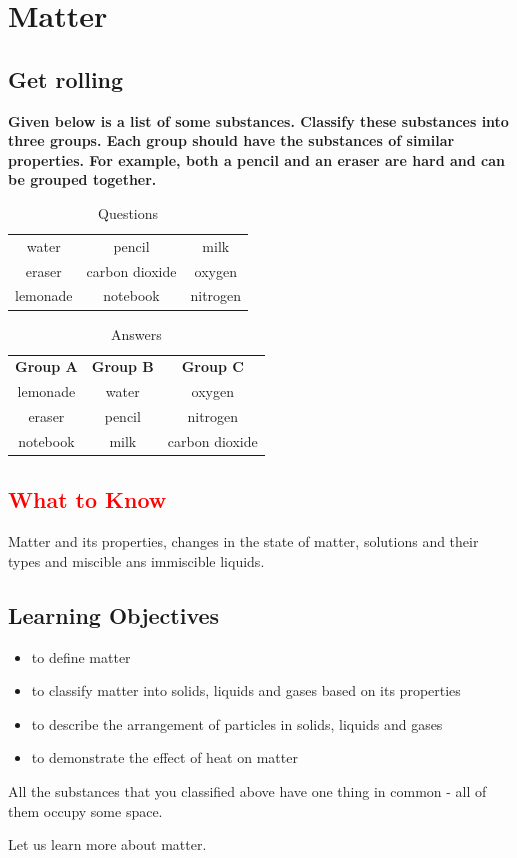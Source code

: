 \chapter{Matter}
\section{\textbf{Get rolling}}
\textbf{Given below is a list of some substances. Classify these substances into three groups. Each group should have the substances of similar properties. For example, both a pencil and an eraser are hard and can be grouped together.}\\
\begin{table}
    \centering
    \begin{tabular}{ccc}
water & pencil & milk\\
eraser & carbon dioxide & oxygen\\
lemonade & notebook & nitrogen
    \end{tabular}
    \caption{Questions}
    \label{tab:placeholder}
\end{table}
\begin{table}
    \centering
    \begin{tabular}{ccc}
\textbf{Group A} & \textbf{Group B} & \textbf{Group C}\\
lemonade & water & oxygen\\
eraser & pencil & nitrogen\\
notebook & milk & carbon dioxide
    \end{tabular}
    \caption{Answers}
    \label{tab:answer}
\end{table}
\section{\textcolor{red}{What to Know}}
Matter and its properties, changes in the state of matter, solutions and their types and miscible ans immiscible liquids.
\section{\textbf{Learning Objectives}}
\begin{itemize}
    \item to define matter
    \item to classify matter into solids, liquids and gases based on its properties
    \item to describe the arrangement of particles in solids, liquids and gases
    \item to demonstrate the effect of heat on matter
\end{itemize}
All the substances that you classified above have one thing in common - all of them occupy some space.\\
\par
Let us learn more about matter.\\
